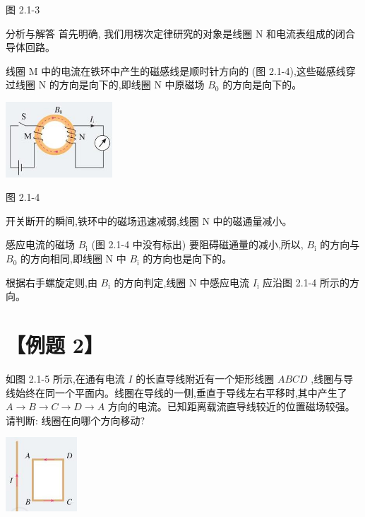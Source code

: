 \documentclass[10pt]{article}
\begin{document}
图 2.1-3

分析与解答 首先明确, 我们用楞次定律研究的对象是线圈 \(\mathrm{N}\) 和电流表组成的闭合导体回路。

线圈 \(\mathrm{M}\) 中的电流在铁环中产生的磁感线是顺时针方向的 (图 2.1-4),这些磁感线穿过线圈 \(\mathrm{N}\) 的方向是向下的,即线圈 \(\mathrm{N}\) 中原磁场 \({B}_{0}\) 的方向是向下的。

\begin{center}
\includegraphics[max width=0.3\textwidth]{images/01910e72-c5b7-7ed5-a6d4-fb3a5faefc32_32_920278.jpg}
\end{center}

图 2.1-4

开关断开的瞬间,铁环中的磁场迅速减弱,线圈 \(\mathrm{N}\) 中的磁通量减小。

感应电流的磁场 \({B}_{\mathrm{i}}\) (图 2.1-4 中没有标出) 要阻碍磁通量的减小,所以, \({B}_{\mathrm{i}}\) 的方向与 \({B}_{0}\) 的方向相同,即线圈 \(\mathrm{N}\) 中 \({B}_{\mathrm{i}}\) 的方向也是向下的。

根据右手螺旋定则,由 \({B}_{\mathrm{i}}\) 的方向判定,线圈 \(\mathrm{N}\) 中感应电流 \({I}_{\mathrm{i}}\) 应沿图 2.1-4 所示的方向。

\section*{【例题 2】}

如图 2.1-5 所示,在通有电流 \(I\) 的长直导线附近有一个矩形线圈 \({ABCD}\) ,线圈与导线始终在同一个平面内。线圈在导线的一侧,垂直于导线左右平移时,其中产生了 \(A \rightarrow B \rightarrow C \rightarrow D \rightarrow A\) 方向的电流。已知距离载流直导线较近的位置磁场较强。请判断: 线圈在向哪个方向移动?

\begin{center}
\includegraphics[max width=0.2\textwidth]{images/01910e72-c5b7-7ed5-a6d4-fb3a5faefc32_32_748696.jpg}
\end{center}
\end{document}
